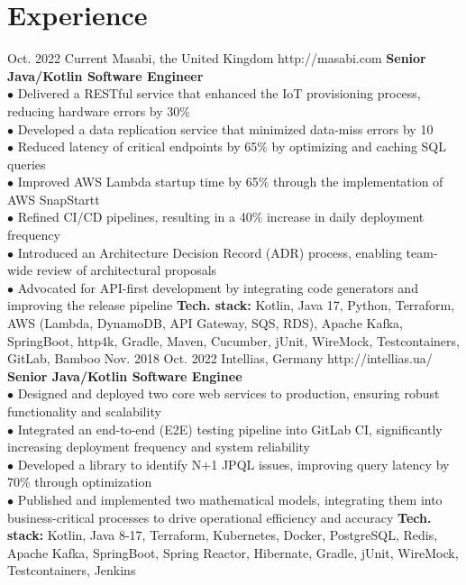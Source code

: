 \documentclass[10pt]{article} %
\begin{document}
\section{Experience}
\job
{Oct. 2022 }{ Current}
{Masabi, the United Kingdom}
{http://masabi.com}
{\textbf{Senior Java/Kotlin Software Engineer}}
{
\textbf{}   
\\$\bullet$ Delivered a RESTful service that enhanced the IoT provisioning process, reducing hardware errors by 30\%
\\$\bullet$ Developed a data replication service that minimized data-miss errors by 10%
\\$\bullet$ Reduced latency of critical endpoints by 65\% by optimizing and caching SQL queries
\\$\bullet$ Improved AWS Lambda startup time by 65\% through the implementation of AWS SnapStartt
\\$\bullet$ Refined CI/CD pipelines, resulting in a 40\% increase in daily deployment frequency
\\$\bullet$ Introduced an Architecture Decision Record (ADR) process, enabling team-wide review of architectural proposals
\\$\bullet$ Advocated for API-first development by integrating code generators and improving the release pipeline
\vadjust{\vspace{4pt}}
\newline
\textbf{Tech. stack: }{Kotlin, Java 17, Python, Terraform, AWS (Lambda, DynamoDB, API Gateway, SQS, RDS), Apache Kafka, SpringBoot, http4k, Gradle, Maven, Cucumber, jUnit, WireMock, Testcontainers, GitLab, Bamboo}   
 }
\job
{Nov. 2018 }{ Oct. 2022}
{Intellias, Germany}
{http://intellias.ua/}
{\textbf{Senior Java/Kotlin Software Enginee}}
{
\textbf{}   
\\$\bullet$ Designed and deployed two core web services to production, ensuring robust functionality and scalability
\\$\bullet$ Integrated an end-to-end (E2E) testing pipeline into GitLab CI, significantly increasing deployment frequency and system reliability
\\$\bullet$ Developed a library to identify N+1 JPQL issues, improving query latency by 70\% through optimization
\\$\bullet$ Published and implemented two mathematical models, integrating them into business-critical processes to drive operational efficiency and accuracy
\vadjust{\vspace{4pt}}
\textbf{Tech. stack: }{Kotlin, Java 8-17, Terraform, Kubernetes, Docker, PostgreSQL, Redis, Apache Kafka, SpringBoot, Spring Reactor, Hibernate, Gradle, jUnit, WireMock, Testcontainers, Jenkins}   
 }
\end{document}
